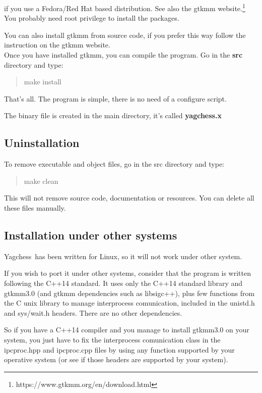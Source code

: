 \documentclass[a4paper]{article}
\newcommand{\nameprog}{Yagchess}
\begin{document}
if you use a Fedora/Red Hat based distribution. See also the gtkmm website.\footnote{https://www.gtkmm.org/en/download.html}
You probably need root privilege to install the packages.

You can also install gtkmm from source code, if you prefer this way follow the instruction on the gtkmm website.\\

Once you have installed gtkmm, you can compile the program. Go in the \textbf{src} directory and type:

\begin{quote}
make install
\end{quote}

That's all. The program is simple, there is no need of a configure script.

The binary file is created in the main directory, it's called \textbf{yagchess.x}


\subsection{Uninstallation}
To remove executable and object files, go in the src directory and type:

\begin{quote}
make clean
\end{quote}

This will not remove source code, documentation or resources. You can delete all these files manually.


\subsection{Installation under other systems}
\nameprog\ has been written for Linux, so it will not work under other system.

If you wish to port it under other systems, consider that the program is written following the C++14 standard. It uses only the C++14 standard library and gtkmm3.0
(and gtkmm dependencies such as libsigc++), plus few functions from the C unix library to manage interprocess comunication, included in the unistd.h and sys/wait.h headers.
There are no other dependencies.

So if you have a C++14 compiler and you manage to install gtkmm3.0 on your system, you just have to fix the interprocess comunication class in the
ipcproc.hpp and ipcproc.cpp files by using any function supported by your operative system (or see if those headers are supported by your system).
\end{document}

